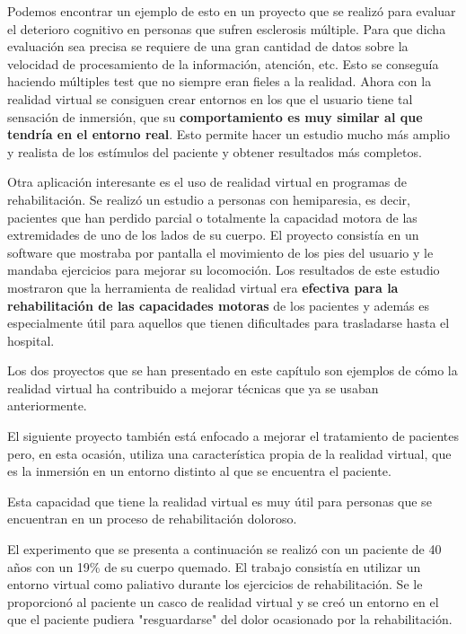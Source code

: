 \documentclass[twoside, 12pt]{epstfg}
\begin{document}
Podemos encontrar un ejemplo de esto en un proyecto que se realizó para evaluar el deterioro cognitivo en personas que sufren esclerosis múltiple. Para que dicha evaluación sea precisa se requiere de una gran cantidad de datos sobre la velocidad de procesamiento de la información, atención, etc. Esto se conseguía haciendo múltiples test que no siempre eran fieles a la realidad.
Ahora con la realidad virtual se consiguen crear entornos en los que el usuario tiene tal sensación de inmersión, que su \textbf{comportamiento es muy similar al que tendría en el entorno real}. Esto permite hacer un estudio mucho más amplio y realista de los estímulos del paciente y obtener resultados más completos.\cite{LamargueHamel201594}


Otra aplicación interesante es el uso de realidad virtual en programas de rehabilitación.
Se realizó un estudio a personas con hemiparesia, es decir, pacientes que han perdido parcial o totalmente la capacidad motora de las extremidades de uno de los lados de su cuerpo. El proyecto consistía en un software que mostraba por pantalla el movimiento de los pies  del usuario y le mandaba ejercicios para mejorar su locomoción. 
Los resultados de este estudio mostraron que la herramienta de realidad virtual era \textbf{efectiva para la rehabilitación de las capacidades motoras} de los pacientes y además es especialmente útil para aquellos que tienen dificultades para trasladarse hasta el hospital.\cite{Llorens2015418}

Los dos proyectos que se han presentado en este capítulo son ejemplos de cómo la realidad virtual ha contribuido a mejorar técnicas que ya se usaban anteriormente.

El siguiente proyecto también está enfocado a mejorar el tratamiento de pacientes pero, en esta ocasión, utiliza una característica propia de la realidad virtual, que es la inmersión en un entorno distinto al que se encuentra el paciente.

Esta capacidad que tiene la realidad virtual es muy útil para personas que se encuentran en un proceso de rehabilitación doloroso.

El experimento que se presenta a continuación se realizó con un paciente de 40 años con un 19\% de su cuerpo quemado. El trabajo consistía en utilizar un entorno virtual como paliativo durante los ejercicios de rehabilitación.
Se le proporcionó al paciente un casco de realidad virtual y se creó un entorno en el que el paciente pudiera "resguardarse" del dolor ocasionado por la rehabilitación.
\end{document}
